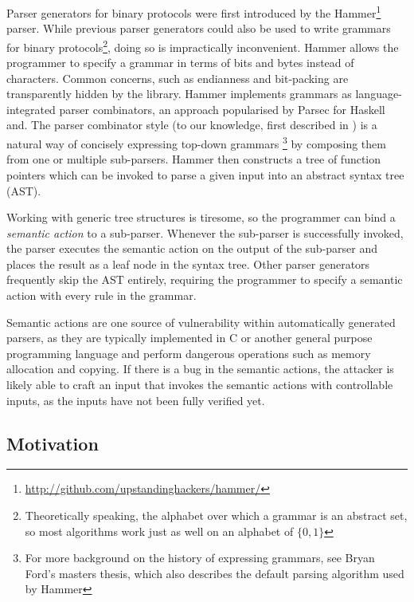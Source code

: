 \documentclass[10pt]{article}
\begin{document}
 Parser generators for binary protocols were first introduced by the Hammer\footnote{\url{http://github.com/upstandinghackers/hammer/}} parser.
 While previous parser generators could also be used to write grammars for binary
 protocols\footnote{Theoretically speaking, the alphabet over which a grammar is an  abstract set,
   so most algorithms work just as well on an alphabet of $\{0,1\}$}, doing so is impractically
 inconvenient. Hammer allows the programmer to specify a grammar in terms of bits and bytes instead
 of characters. Common concerns, such as endianness and bit-packing are transparently hidden by the
 library. Hammer implements grammars as language-integrated parser combinators, an approach
 popularised by Parsec for Haskell\cite{LeijenMeijer:parsec} and. The parser combinator style (to our
 knowledge, first  described in \cite{burge1975recursive}) is a natural way of concisely expressing
 top-down grammars\cite{Danielsson:2010:TPC:1863543.1863585} \footnote{For more background on the history of expressing grammars, see Bryan
   Ford's masters thesis\cite{ford2002packrat}, which also describes the default parsing algorithm used by Hammer} by composing them from one or multiple sub-parsers. 
  Hammer then constructs a tree of function pointers which
 can be invoked to parse a given input into an abstract syntax tree (AST).
 
Working with generic tree structures is tiresome, so the programmer can bind a \textit{semantic action} to a
sub-parser. Whenever the sub-parser is successfully invoked, the parser executes the semantic action
on the output of the sub-parser and places the result as a leaf node in the syntax tree. Other
parser generators frequently skip the AST entirely, requiring the programmer to specify a semantic
action with every rule in the grammar. 

Semantic actions are one source of vulnerability within automatically generated parsers, as they are
typically implemented in C or another general purpose programming language and perform dangerous
operations such as memory allocation and copying. If there is a bug in the semantic actions, the
attacker is likely able to craft an input that invokes the semantic actions with controllable
inputs, as the inputs have not been fully verified yet.

\subsection{Motivation}
\end{document}
